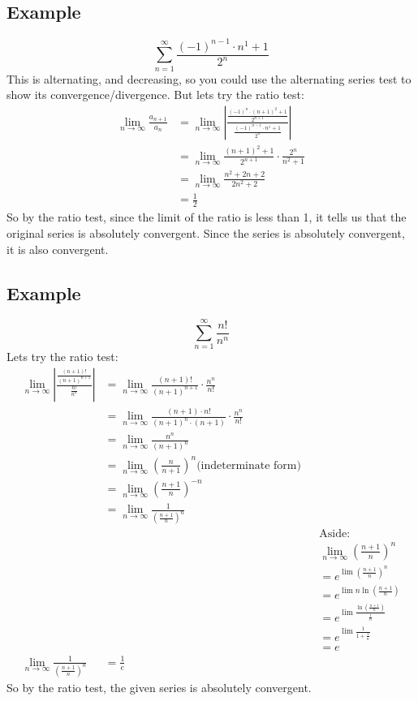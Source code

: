 \documentclass{report}
\begin{document}
    \subsection{Example}
        \[\sum_{n = 1}^{\infty} \frac{(-1)^{n-1} \cdot n^1 + 1}{2^n} \]
        This is alternating, and decreasing, so you could use the alternating series test to show its convergence/divergence.
        But lets try the ratio test:
        \begin{align*}
            \lim_{n \to \infty} \frac{a_{n+1}}{a_n} & = \lim_{n \to \infty} \left| \frac{\frac{(-1)^n \cdot (n+1)^2 + 1}{2^{n+1}}}{\frac{(-1)^{n-1} \cdot n^1 + 1}{2^n}} \right| \\
            & = \lim_{n \to \infty} \frac{(n+1)^2 + 1}{2^{n+1}} \cdot \frac{2^n}{n^2+1} \\
            & = \lim_{n \to \infty} \frac{n^2+2n+2}{2n^2+2} \\
            & = \frac{1}{2}
        \end{align*}
        So by the ratio test, since the limit of the ratio is less than 1, it tells us that the original series is absolutely convergent.
        Since the series is absolutely convergent, it is also convergent.
    
    \subsection{Example}
        \[\sum_{n = 1}^{\infty} \frac{n!}{n^n} \]
        Lets try the ratio test:
        \begin{align*}
            \lim_{n \to \infty} \left| \frac{\frac{(n+1)!}{(n+1)^{n+1}}}{\frac{n!}{n^n}} \right| & = \lim_{n \to \infty} \frac{(n+1)!}{(n+1)^{n+1}} \cdot \frac{n^n}{n!} \\
            & = \lim_{n \to \infty} \frac{(n+1) \cdot n!}{(n+1)^{n} \cdot (n+1)} \cdot \frac{n^n}{n!} \\
            & = \lim_{n \to \infty} \frac{n^n}{(n+1)^n} \\
            & = \lim_{n \to \infty} \left( \frac{n}{n+1} \right)^n \text{(indeterminate form)}\\
            & = \lim_{n \to \infty} \left( \frac{n+1}{n}\right)^{-n} \\
            & = \lim_{n \to \infty} \frac{1}{\left( \frac{n+1}{n}\right)^{n}} \\
            && &\text{Aside:} \\
            && &\lim_{n \to \infty} \left( \frac{n+1}{n}\right)^{n} \\
            && &= e^{\lim \left( \frac{n+1}{n}\right)^{n}} \\
            && &= e^{\lim n \ln \left( \frac{n+1}{n}\right)} \\
            && &= e^{\lim \frac{\ln \left( \frac{n+1}{n}\right)}{\frac{1}{n}}} \\
            && &= e^{\lim \frac{1}{1+\frac{1}{n}}} \\
            && &= e \\
            \lim_{n \to \infty} \frac{1}{\left( \frac{n+1}{n}\right)^{n}} &= \frac{1}{e}
        \end{align*}
       So by the ratio test, the given series is absolutely convergent.
    
\end{document}
